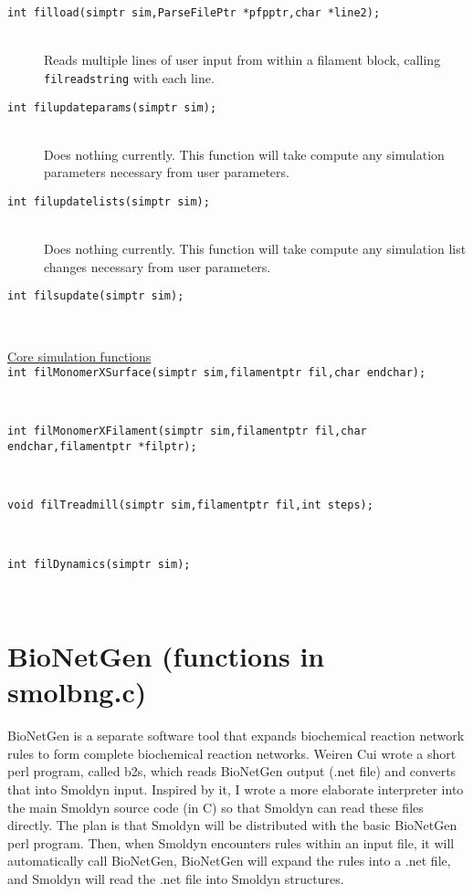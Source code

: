 \documentclass {book}
\begin{document}
\begin{description}
\item[\texttt{int filload(simptr sim,ParseFilePtr *pfpptr,char *line2);}]
\hfill \\
Reads multiple lines of user input from within a filament block, calling \texttt{filreadstring} with each line.

\item[\texttt{int filupdateparams(simptr sim);}]
\hfill \\
Does nothing currently. This function will take compute any simulation parameters necessary from user parameters.

\item[\texttt{int filupdatelists(simptr sim);}]
\hfill \\
Does nothing currently. This function will take compute any simulation list changes necessary from user parameters.

\item[\texttt{int filsupdate(simptr sim);}]
\hfill \\

\item[\underline{Core simulation functions}]

\item[\texttt{int filMonomerXSurface(simptr sim,filamentptr fil,char endchar);}]
\hfill \\

\item[\texttt{int filMonomerXFilament(simptr sim,filamentptr fil,char endchar,filamentptr *filptr);}]
\hfill \\

\item[\texttt{void filTreadmill(simptr sim,filamentptr fil,int steps);}]
\hfill \\

\item[\texttt{int filDynamics(simptr sim);}]
\hfill \\



\end{description}

\section{BioNetGen (functions in smolbng.c)}

BioNetGen is a separate software tool that expands biochemical reaction network rules to form complete biochemical reaction networks. Weiren Cui wrote a short perl program, called b2s, which reads BioNetGen output (.net file) and converts that into Smoldyn input. Inspired by it, I wrote a more elaborate interpreter into the main Smoldyn source code (in C) so that Smoldyn can read these files directly. The plan is that Smoldyn will be distributed with the basic BioNetGen perl program. Then, when Smoldyn encounters rules within an input file, it will automatically call BioNetGen, BioNetGen will expand the rules into a .net file, and Smoldyn will read the .net file into Smoldyn structures.
\end{document}
